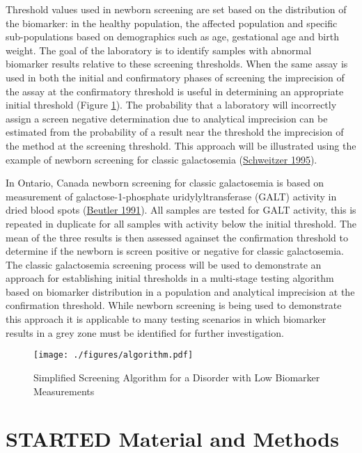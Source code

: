 \documentclass[review]{elsarticle}
\begin{document}
Threshold values used in newborn screening are set based on the
distribution of the biomarker: in the healthy population, the affected
population and specific sub-populations based on demographics such as
age, gestational age and birth weight. The goal of the laboratory is
to identify samples with abnormal biomarker results relative to these
screening thresholds. When the same assay is used in both the initial
and confirmatory phases of screening the imprecision of the assay at
the confirmatory threshold is useful in determining an appropriate
initial threshold (Figure \ref{fig:orgc1204cf}). The probability that a
laboratory will incorrectly assign a screen negative determination due
to analytical imprecision can be estimated from the probability of a
result near the threshold the imprecision of the method at the
screening threshold. This approach will be illustrated using the
example of newborn screening for classic galactosemia (\hyperlink{citeproc_bib_item_6}{Schweitzer 1995}).

In Ontario, Canada newborn screening for classic galactosemia is based
on measurement of galactose-1-phosphate uridylyltransferase (GALT)
activity in dried blood spots (\hyperlink{citeproc_bib_item_1}{Beutler 1991}). All samples are
tested for GALT activity, this is repeated in duplicate for all
samples with activity below the initial threshold. The mean of the
three results is then assessed againset the confirmation threshold to
determine if the newborn is screen positive or negative for classic
galactosemia. The classic galactosemia screening process will be used
to demonstrate an approach for establishing initial thresholds in a
multi-stage testing algorithm based on biomarker distribution in a
population and analytical imprecision at the confirmation
threshold. While newborn screening is being used to demonstrate this
approach it is applicable to many testing scenarios in which biomarker
results in a grey zone must be identified for further investigation.


\begin{figure}[htbp]
\centering
\texttt{[image: ./figures/algorithm.pdf]}
\caption{\label{fig:orgc1204cf}Simplified Screening Algorithm for a Disorder with Low Biomarker Measurements}
\end{figure}

\clearpage

\section*{{\bfseries\sffamily STARTED} Material and Methods}
\label{sec:org92ee49c}
\end{document}
